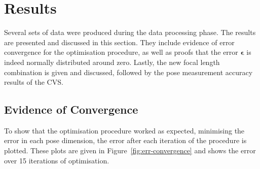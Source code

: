\section{Results}

Several sets of data were produced during the data processing phase. The results are presented and discussed in this section. They include evidence of error convergence for the optimisation procedure, as well as proofs that the error $\bm{\epsilon}$ is indeed normally distributed around zero. Lastly, the new focal length combination is given and discussed, followed by the pose measurement accuracy results of the CVS. 

\subsection{Evidence of Convergence}

To show that the optimisation procedure worked as expected, minimising the error in each pose dimension, the error after each iteration of the procedure is plotted. These plots are given in Figure~\ref{fig:err-convergence} and shows the error over 15 iterations of optimisation.  

